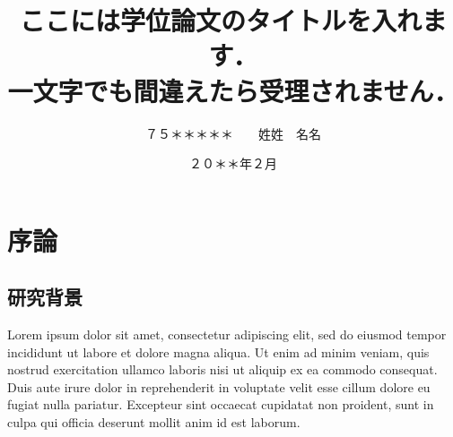 \documentclass[paper=a4paper,report,fontsize=12pt,jafontsize=12pt]{jlreq}
\begin{document}


\title{ここには学位論文のタイトルを入れます．\\ 一文字でも間違えたら受理されません．}

\date{２０＊＊年２月}
\author{７５＊＊＊＊＊　　姓姓　名名}

\makecover


\chapter{序論}
\label{ch:introduction}

\section{研究背景}
\label{sec:background}

Lorem ipsum dolor sit amet, consectetur adipiscing elit, sed do eiusmod tempor incididunt ut labore et dolore magna aliqua.
Ut enim ad minim veniam, quis nostrud exercitation ullamco laboris nisi ut aliquip ex ea commodo consequat.
Duis aute irure dolor in reprehenderit in voluptate velit esse cillum dolore eu fugiat nulla pariatur.
Excepteur sint occaecat cupidatat non proident, sunt in culpa qui officia deserunt mollit anim id est laborum.



% 
% 
\end{document}
